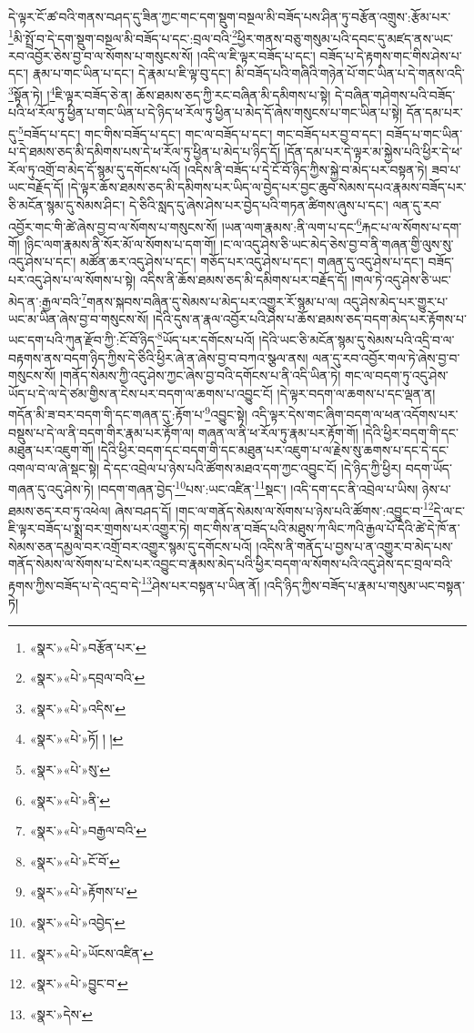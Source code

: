 དེ་ལྟར་ངོ་ཚ་བའི་གནས་བཤད་དུ་ཟིན་ཀྱང་གང་དག་སྡུག་བསྔལ་མི་བཟོད་པས་ཤིན་ཏུ་བརྩོན་འགྲུས་:རྩོམ་པར་\footnote{«སྣར་»«པེ་»བརྩོན་པར་}མི་སྤྲོ་བ་དེ་དག་སྡུག་བསྔལ་མི་བཟོད་པ་དང་:བྲལ་བའི་\footnote{«སྣར་»«པེ་»དབྲལ་བའི་}ཕྱིར་གནས་བཅུ་གསུམ་པའི་དབང་དུ་མཛད་ནས་ཡང་རབ་འབྱོར་ཅེས་བྱ་བ་ལ་སོགས་པ་གསུངས་སོ། །འདི་ལ་ཇི་ལྟར་བཟོད་པ་དང་། བཟོད་པ་དེ་རྟགས་གང་གིས་ཤེས་པ་དང་། རྣམ་པ་གང་ཡིན་པ་དང་། དེ་རྣམ་པ་ཇི་ལྟ་བུ་དང་། མི་བཟོད་པའི་གཞིའི་གཉེན་པོ་གང་ཡིན་པ་དེ་གནས་འདི་\footnote{«སྣར་»«པེ་»འདིས་}སྟོན་ཏེ། །\footnote{«སྣར་»«པེ་»ཏོ། ། །}ཇི་ལྟར་བཟོད་ཅེ་ན། ཆོས་ཐམས་ཅད་ཀྱི་རང་བཞིན་མི་དམིགས་པ་སྟེ། དེ་བཞིན་གཤེགས་པའི་བཟོད་པའི་ཕ་རོལ་ཏུ་ཕྱིན་པ་གང་ཡིན་པ་དེ་ཉིད་ཕ་རོལ་ཏུ་ཕྱིན་པ་མེད་དོ་ཞེས་གསུངས་པ་གང་ཡིན་པ་སྟེ། དོན་དམ་པར་དུ་\footnote{«སྣར་»«པེ་»སུ་}བཟོད་པ་དང་། གང་གིས་བཟོད་པ་དང་། གང་ལ་བཟོད་པ་དང་། གང་བཟོད་པར་བྱ་བ་དང་། བཟོད་པ་གང་ཡིན་པ་དེ་ཐམས་ཅད་མི་དམིགས་པས་དེ་ཕ་རོལ་ཏུ་ཕྱིན་པ་མེད་པ་ཉིད་དོ། །དོན་དམ་པར་དེ་ལྟར་མ་སྐྱེས་པའི་ཕྱིར་དེ་ཕ་རོལ་ཏུ་འགྲོ་བ་མེད་དོ་སྙམ་དུ་དགོངས་པའོ། །འདིས་ནི་བཟོད་པ་དེ་ངོ་བོ་ཉིད་ཀྱིས་སྐྱེ་བ་མེད་པར་བསྟན་ཏེ། ཟབ་པ་ཡང་བརྗོད་དོ། །དེ་ལྟར་ཆོས་ཐམས་ཅད་མི་དམིགས་པར་ཡིད་ལ་བྱེད་པར་བྱང་ཆུབ་སེམས་དཔའ་རྣམས་བཟོད་པར་ཅི་མངོན་སྙམ་དུ་སེམས་ཤིང་། དེ་ཅིའི་སླད་དུ་ཞེས་ཤེས་པར་བྱེད་པའི་གཏན་ཚིགས་ཞུས་པ་དང་། ལན་དུ་རབ་འབྱོར་གང་གི་ཚེ་ཞེས་བྱ་བ་ལ་སོགས་པ་གསུངས་སོ། །ཡན་ལག་རྣམས་:ནི་ལག་པ་དང་\footnote{«སྣར་»«པེ་»ནི་}རྐང་པ་ལ་སོགས་པ་དག་གོ། །ཉིང་ལག་རྣམས་ནི་སོར་མོ་ལ་སོགས་པ་དག་གོ། །ང་ལ་འདུ་ཤེས་ཅི་ཡང་མེད་ཅེས་བྱ་བ་ནི་གཞན་གྱི་ལུས་སུ་འདུ་ཤེས་པ་དང་། མཚོན་ཆར་འདུ་ཤེས་པ་དང་། གཅོད་པར་འདུ་ཤེས་པ་དང་། གཞན་དུ་འདུ་ཤེས་པ་དང་། བཟོད་པར་འདུ་ཤེས་པ་ལ་སོགས་པ་སྟེ། འདིས་ནི་ཆོས་ཐམས་ཅད་མི་དམིགས་པར་བརྗོད་དོ། །གལ་ཏེ་འདུ་ཤེས་ཅི་ཡང་མེད་ན་:རྒྱལ་བའི་\footnote{«སྣར་»«པེ་»བརྒྱལ་བའི་}གནས་སྐབས་བཞིན་དུ་སེམས་པ་མེད་པར་འགྱུར་རོ་སྙམ་པ་ལ། འདུ་ཤེས་མེད་པར་གྱུར་པ་ཡང་མ་ཡིན་ཞེས་བྱ་བ་གསུངས་སོ། །དེའི་དུས་ན་རྣལ་འབྱོར་པའི་ཤེས་པ་ཆོས་ཐམས་ཅད་བདག་མེད་པར་རྟོགས་པ་ཡང་དག་པའི་ཀུན་རྫོབ་ཀྱི་:ངོ་བོ་ཉིད་\footnote{«སྣར་»«པེ་»ངོ་བོ་}ཡོད་པར་དགོངས་པའོ། །དེའི་ཡང་ཅི་མངོན་སྙམ་དུ་སེམས་པའི་འདྲི་བ་ལ་བརྟགས་ནས་བདག་ཉིད་ཀྱིས་དེ་ཅིའི་ཕྱིར་ཞེ་ན་ཞེས་བྱ་བ་བཀའ་སྩལ་ནས། ལན་དུ་རབ་འབྱོར་གལ་ཏེ་ཞེས་བྱ་བ་གསུངས་སོ། །གནོད་སེམས་ཀྱི་འདུ་ཤེས་ཀྱང་ཞེས་བྱ་བའི་དགོངས་པ་ནི་འདི་ཡིན་ཏེ། གང་ལ་བདག་ཏུ་འདུ་ཤེས་ཡོད་པ་དེ་ལ་དེ་ཙམ་གྱིས་ན་ངེས་པར་བདག་ལ་ཆགས་པ་འབྱུང་ངོ། །དེ་ལྟར་བདག་ལ་ཆགས་པ་དང་ལྡན་ན། གདོན་མི་ཟ་བར་བདག་གི་དང་གཞན་དུ་:རྟོག་པ་\footnote{«སྣར་»«པེ་»རྟོགས་པ་}འབྱུང་སྟེ། འདི་ལྟར་དེས་གང་ཞིག་བདག་ལ་ཕན་འདོགས་པར་བསྡུས་པ་དེ་ལ་ནི་བདག་གིར་རྣམ་པར་རྟོག་ལ། གཞན་ལ་ནི་ཕ་རོལ་ཏུ་རྣམ་པར་རྟོག་གོ། །དེའི་ཕྱིར་བདག་གི་དང་མཐུན་པར་འཇུག་གོ། །དེའི་ཕྱིར་བདག་དང་བདག་གི་དང་མཐུན་པར་འཇུག་པ་ལ་རྗེས་སུ་ཆགས་པ་དང་དེ་དང་འགལ་བ་ལ་ཞེ་སྡང་སྟེ། དེ་དང་འབྲེལ་པ་ཉེས་པའི་ཚོགས་མཐའ་དག་ཀྱང་འབྱུང་ངོ། །དེ་ཉིད་ཀྱི་ཕྱིར། བདག་ཡོད་གཞན་དུ་འདུ་ཤེས་ཏེ། །བདག་གཞན་བྱེད་\footnote{«སྣར་»«པེ་»འབྱེད་}པས་:ཡང་འཛིན་\footnote{«སྣར་»«པེ་»ཡོངས་འཛིན་}སྡང་། །འདི་དག་དང་ནི་འབྲེལ་པ་ཡིས། ཉེས་པ་ཐམས་ཅད་རབ་ཏུ་འཕེལ། ཞེས་བཤད་དོ། །གང་ལ་གནོད་སེམས་ལ་སོགས་པ་ཉེས་པའི་ཚོགས་:འབྱུང་བ་\footnote{«སྣར་»«པེ་»བྱུང་བ་}དེ་ལ་ང་ཇི་ལྟར་བཟོད་པ་སྨྲ་བར་གྲགས་པར་འགྱུར་ཏེ། གང་གིས་ན་བཟོད་པའི་མཐུས་ཀ་ལིང་ཀའི་རྒྱལ་པོ་དེའི་ཚེ་དེ་ཁོ་ན་སེམས་ཅན་དམྱལ་བར་འགྲོ་བར་འགྱུར་སྙམ་དུ་དགོངས་པའོ། །འདིས་ནི་གནོད་པ་བྱས་པ་ན་འགྱུར་བ་མེད་པས་གནོད་སེམས་ལ་སོགས་པ་ངེས་པར་འབྱུང་བ་རྣམས་མེད་པའི་ཕྱིར་བདག་ལ་སོགས་པའི་འདུ་ཤེས་དང་བྲལ་བའི་རྟགས་ཀྱིས་བཟོད་པ་དེ་འདྲ་བ་དེ་\footnote{«སྣར་»དེས་}ཤེས་པར་བསྟན་པ་ཡིན་ནོ། །འདི་ཉིད་ཀྱིས་བཟོད་པ་རྣམ་པ་གསུམ་ཡང་བསྟན་ཏེ། 